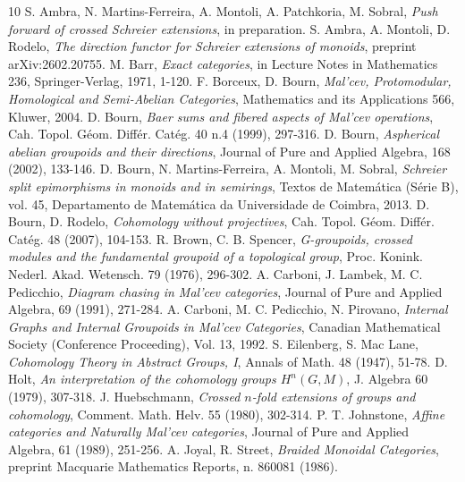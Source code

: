 \documentclass[a4paper]{amsart}
\theoremstyle{plain}
\theoremstyle{definition}
\theoremstyle{remark}
\begin{document}
\begin{thebibliography}{10}
 S. Ambra, N. Martins-Ferreira, A. Montoli, A. Patchkoria, M. Sobral, \emph{Push forward of crossed Schreier extensions}, in preparation.
 S. Ambra, A. Montoli, D. Rodelo, \emph{The direction functor for Schreier extensions of monoids}, preprint arXiv:2602.20755.
 M. Barr, \emph{Exact categories}, in Lecture Notes in Mathematics 236, Springer-Verlag, 1971, 1-120.
 F. Borceux, D. Bourn, \emph{Mal'cev, Protomodular, Homological and Semi-Abelian Categories}, Mathematics and its Applications 566, Kluwer, 2004.
 D. Bourn, \emph{Baer sums and fibered aspects of Mal'cev operations}, Cah. Topol. G\'eom. Diff\'er. Cat\'eg. 40 n.4 (1999), 297-316.
 D. Bourn, \emph{Aspherical abelian groupoids and their directions}, Journal of Pure and Applied Algebra, 168 (2002), 133-146.
 D. Bourn, N. Martins-Ferreira, A. Montoli, M. Sobral, \emph{Schreier split epimorphisms in monoids and in semirings}, Textos de Matem\'atica (S\'erie B), vol. 45, Departamento de Matem\'atica da Universidade de Coimbra, 2013.
 D. Bourn, D. Rodelo, \emph{Cohomology without projectives}, Cah. Topol. G\'eom. Diff\'er. Cat\'eg. 48 (2007), 104-153.
 R. Brown, C. B. Spencer, \emph{G-groupoids, crossed modules and the
fundamental groupoid of a topological group}, Proc. Konink. Nederl. Akad.
Wetensch. 79 (1976), 296-302.
 A. Carboni, J. Lambek, M. C. Pedicchio, \emph{Diagram chasing in Mal'cev categories}, Journal of Pure and Applied Algebra, 69 (1991), 271-284.
 A. Carboni, M. C. Pedicchio, N. Pirovano, \emph{Internal Graphs and Internal Groupoids in Mal'cev Categories}, Canadian Mathematical Society (Conference Proceeding), Vol. 13, 1992.
 S. Eilenberg, S. Mac Lane, \emph{Cohomology Theory in Abstract Groups, I}, Annals of Math. 48 (1947), 51-78.
 D. Holt, \emph{An interpretation of the cohomology groups $H^n(G, M)$}, J. Algebra 60 (1979), 307-318.
 J. Huebschmann, \emph{Crossed $n$-fold extensions of groups and cohomology}, Comment. Math. Helv. 55 (1980), 302-314.
 P. T. Johnstone, \emph{Affine categories and Naturally Mal'cev categories}, Journal of Pure and Applied Algebra, 61 (1989), 251-256.
 A. Joyal, R. Street, \emph{Braided Monoidal Categories}, preprint Macquarie Mathematics Reports, n. 860081 (1986).

\end{thebibliography}
\end{document}
